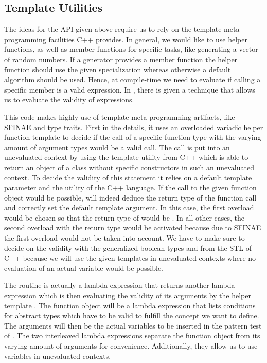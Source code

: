 \documentclass{stdlocal}
\begin{document}
  \subsection{Template Utilities} %
  \label{sub:utilities}
    The ideas for the API given above require us to rely on the template meta programming facilities C++ provides.
    In general, we would like to use helper functions, as well as member functions for specific tasks, like generating a vector of random numbers.
    If a generator provides a member function the helper function should use the given specialization whereas otherwise a default algorithm should be used.
    Hence, at compile-time we need to evaluate if calling a specific member is a valid expression.
    In \textcite{vandevoorde2018}, there is given a technique that allows us to evaluate the validity of expressions.

    This code makes highly use of template meta programming artifacts, like SFINAE and type traits.
    First in the details, it uses an overloaded variadic helper function template  to decide if the call of a specific function type  with the varying amount of argument types  would be a valid call.
    The call is put into an unevaluated context by using the  template utility from C++ which is able to return an object of a class without specific constructors in such an unevaluated context.
    To decide the validity of this statement it relies on a default template parameter and the  utility of the C++ language.
    If the call to the given function object would be possible,  will indeed deduce the return type of the function call and correctly set the default template argument.
    In this case, the first overload would be chosen so that the return type of  would be .
    In all other cases, the second overload with the return type  would be activated because due to SFINAE the first overload would not be taken into account.
    We have to make sure to decide on the validity with the generalized boolean types  and  from the STL of C++ because we will use the given templates in unevaluated contexts where no evaluation of an actual  variable would be possible.

    The routine  is actually a lambda expression that returns another lambda expression which is then evaluating the validity of its arguments by the helper template .
    The function object  will be a lambda expression that lists conditions for abstract types which have to be valid to fulfill the concept we want to define.
    The arguments  will then be the actual variables to be inserted in the pattern test of .
    The two interleaved lambda expressions separate the function object  from its varying amount of arguments  for convenience.
    Additionally, they allow us to use variables in unevaluated contexts.
\end{document}
